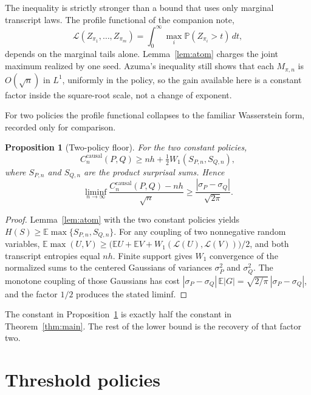 \documentclass[11pt]{article}
\newtheorem{proposition}[theorem]{Proposition}
\theoremstyle{definition}
\newcommand{\causal}{\mathrm{causal}}
\newcommand{\E}{\mathbb{E}}
\newcommand{\Prob}{\mathbb{P}}
\begin{document}
The inequality is strictly stronger than a bound that uses only marginal transcript laws.
The profile functional of the companion note,
\[
  \mathcal L(Z_{\pi_1},\ldots,Z_{\pi_m})
  =\int_0^\infty \max_i\Prob(Z_{\pi_i}>t)\,dt,
\]
depends on the marginal tails alone.
Lemma~\ref{lem:atom} charges the joint maximum realized by one seed.
Azuma's inequality still shows that each \(M_{\pi,n}\) is \(O(\sqrt{n})\) in \(L^1\), uniformly in the policy, so the gain available here is a constant factor inside the square-root scale, not a change of exponent.

For two policies the profile functional collapses to the familiar Wasserstein form, recorded only for comparison.

\begin{proposition}[Two-policy floor]
\label{prop:two}
For the two constant policies,
\[
  C_n^{\causal}(P,Q)
  \ge
  nh+\tfrac12 W_1(S_{P,n},S_{Q,n}),
\]
where \(S_{P,n}\) and \(S_{Q,n}\) are the product surprisal sums.
Hence
\[
  \liminf_{n\to\infty}
  \frac{C_n^{\causal}(P,Q)-nh}{\sqrt{n}}
  \ge
  \frac{|\sigma_P-\sigma_Q|}{\sqrt{2\pi}}.
\]
\end{proposition}

\begin{proof}
Lemma~\ref{lem:atom} with the two constant policies yields
\(H(S)\ge\E\max\{S_{P,n},S_{Q,n}\}\).
For any coupling of two nonnegative random variables,
\(\E\max(U,V)\ge\bigl(\E U+\E V+W_1(\mathcal L(U),\mathcal L(V))\bigr)/2\),
and both transcript entropies equal \(nh\).
Finite support gives \(W_1\) convergence of the normalized sums to the centered Gaussians of variances \(\sigma_P^2\) and \(\sigma_Q^2\).
The monotone coupling of those Gaussians has cost \(|\sigma_P-\sigma_Q|\,\E|G|=\sqrt{2/\pi}\,|\sigma_P-\sigma_Q|\), and the factor \(1/2\) produces the stated liminf.
\end{proof}

The constant in Proposition~\ref{prop:two} is exactly half the constant in Theorem~\ref{thm:main}.
The rest of the lower bound is the recovery of that factor two.

\section{Threshold policies}
\label{sec:threshold}
\end{document}
